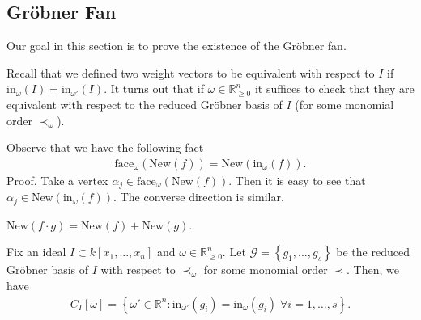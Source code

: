 \documentclass[a4paper, 11pt]{article}
\begin{document}
\subsection{Gröbner Fan}

Our goal in this section is to prove the existence of the Gröbner fan. 

Recall that we defined two weight vectors to be equivalent with respect to \( I \) if \( \mathrm{in}_\omega(I) = \mathrm{in}_{\omega'}(I) \). It turns out that if \( \omega \in \mathbb R^n_{\geq 0} \) it suffices to check that they are equivalent with respect to the reduced Gröbner basis of \( I \) (for some monomial order \( \prec_\omega \)). 

\begin{remark}\label{facenewf}
  Observe that we have the following fact 
  \begin{align*}
    \mathrm{face}_\omega(\mathrm{New}(f)) = \mathrm{New}(\mathrm{in}_\omega(f)).
  \end{align*}
  Proof. Take a vertex \( \alpha_j \in  \mathrm{face}_\omega(\mathrm{New}(f)) \). Then it is easy to see that \( \alpha_j \in   \mathrm{New}(\mathrm{in}_\omega(f))\). The converse direction is similar.
\end{remark}

\begin{prop}
  \( \mathrm{New}(f \cdot g) = \mathrm{New}(f) + \mathrm{New}(g) \).
\end{prop}

\begin{prop}\label{groebner-fan-lemma}
  Fix an ideal \( I \subset k[x_1,...,x_n] \) and \( \omega \in \mathbb R^n_{\geq 0} \). Let \( \mathcal{G} = \left\{ g_1,...,g_s \right\} \) be the reduced Gröbner basis of \( I \) with respect to \( \prec_\omega \) for some monomial order \( \prec \). Then, we have 
  \begin{align*}
    C_I[\omega] = \left\{ \omega' \in \mathbb R^n : \mathrm{in}_{\omega'}(g_i) = \mathrm{in}_\omega(g_i) \; \forall i = 1, \dots , s \right\}.
  \end{align*}
\end{prop}
\end{document}
